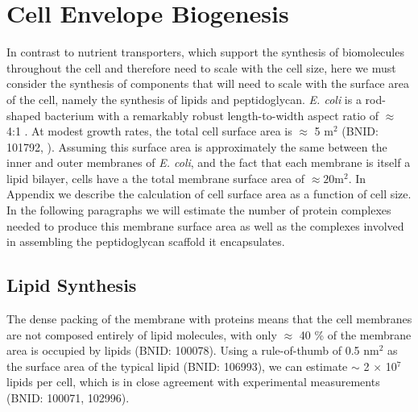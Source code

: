 \section{Cell Envelope Biogenesis}
In contrast to nutrient transporters, which support the synthesis of biomolecules
throughout the cell and therefore need to scale with the cell size, here we must
consider the synthesis of components that will need to scale with the surface
area of the cell, namely the synthesis of lipids and peptidoglycan. \textit{E.
coli} is a rod-shaped bacterium with a remarkably robust length-to-width aspect
ratio of $\approx$ 4:1 \citep{harris2018, ojkic2019}. At modest growth rates,
the total cell surface area is $\approx$ 5 \textmu m$^2$ (BNID: 101792,
\cite{milo2010}). Assuming this surface area is approximately the same between
the inner and outer membranes of \textit{E. coli}, and the fact that each
membrane is itself a lipid bilayer, cells have a the total membrane surface area
of $\approx 20$\textmu m$^2$. In Appendix  we describe
the calculation of cell surface area as a function of cell size. In the
following paragraphs we will estimate the number of protein complexes needed to
produce this membrane surface area as well as the complexes involved in
assembling the peptidoglycan scaffold it encapsulates.

\subsection{Lipid Synthesis}
The dense packing of the membrane with proteins means that the cell membranes
are not composed entirely of lipid molecules, with  only $\approx$ 40 \% of the
membrane area is occupied by lipids (BNID: 100078). Using a rule-of-thumb of 0.5
nm$^2$ as the surface area of the typical lipid (BNID: 106993), we can
estimate $\sim$ 2 $\times$ 10$^7$ lipids per cell, which is in close
agreement with experimental measurements (BNID: 100071, 102996).

